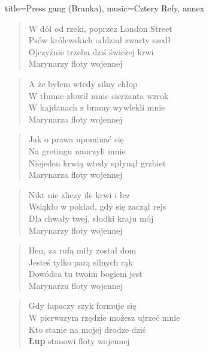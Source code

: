 \newpage
\begin{song}{title={Press gang (Branka)}, music={Cztery Refy}, annex}
    \begin{verse}
        W dół od rzeki, poprzez London Street \\
        Psów królewskich oddział zwarty szedł \\
        Ojczyźnie trzeba dziś świeżej krwi \\
        Marynarzy floty wojennej
    \end{verse}
    \begin{verse}
        A że byłem wtedy silny chłop\\
        W tłumie złowił mnie sierżanta wzrok \\
        W kajdanach z bramy wywlekli mnie \\
        Marynarza floty wojennej
    \end{verse}
    \begin{verse}
        Jak o prawa upominać się \\
        Na gretingu nauczyli mnie \\
        Niejeden krwią wtedy spłynął grzbiet \\
        Marynarza floty wojennej
    \end{verse}
    \begin{verse}
        Nikt nie zliczy ile krwi i łez \\
        Wsiąkło w pokład, gdy się zaczął rejs \\
        Dla chwały twej, słodki kraju mój \\
        Marynarzy floty wojennej
    \end{verse}
    \begin{verse}
        Hen, za rufą miły został dom \\
        Jesteś tylko parą silnych rąk \\
        Dowódca tu twoim bogiem jest \\
        Marynarzu floty wojennej
    \end{verse}
    \begin{verse}
        Gdy łapaczy szyk formuje się \\
        W pierwszym rzędzie możesz ujrzeć mnie \\
        Kto stanie na mojej drodze dziś \\
        \textbf{Łup} stanowi floty wojennej
    \end{verse}
\end{song}
